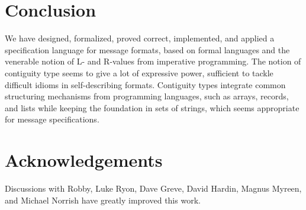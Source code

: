 \documentclass[a4paper,UKenglish,cleveref, autoref, thm-restate]{lipics-v2021}
\begin{document}
\section{Conclusion}

We have designed, formalized, proved correct, implemented, and applied
a specification language for message formats, based on formal
languages and the venerable notion of L- and R-values from imperative
programming. The notion of contiguity type seems to give a lot of
expressive power, sufficient to tackle difficult idioms in
self-describing formats. Contiguity types integrate common structuring
mechanisms from programming languages, such as arrays, records, and
lists while keeping the foundation in sets of strings, which seems
appropriate for message specifications.

\section*{Acknowledgements}

Discussions with Robby, Luke Ryon, Dave Greve, David Hardin, Magnus
Myreen, and Michael Norrish have greatly improved this work.


\end{document}
